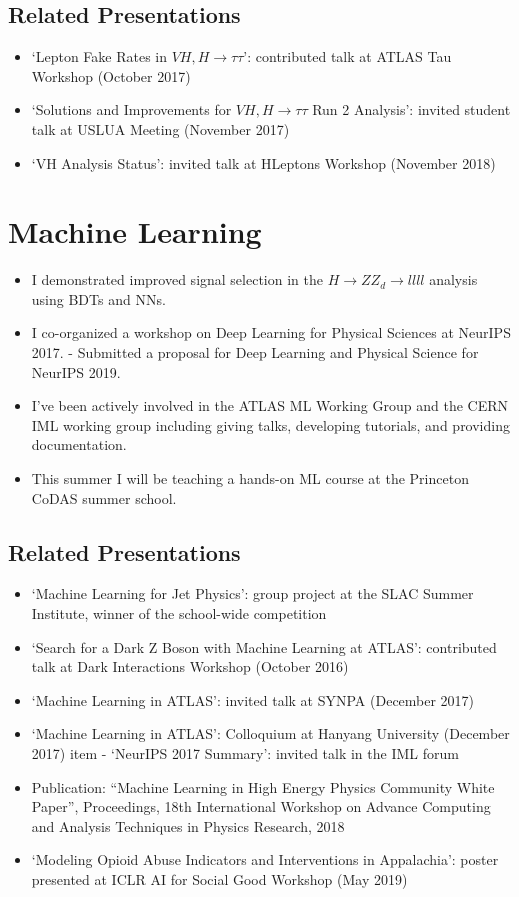 \subsection{Related Presentations}
\begin{itemize}
    \item ‘Lepton Fake Rates in $VH,H\rightarrow\tau\tau$’: contributed talk at ATLAS Tau Workshop (October 2017)
    \item ‘Solutions and Improvements for $VH,H\rightarrow\tau\tau$ Run 2 Analysis’: invited student talk at USLUA Meeting (November 2017)
    \item ‘VH Analysis Status’: invited talk at HLeptons Workshop (November 2018)
\end{itemize}

\section{Machine Learning}
\begin{itemize}
    \item I demonstrated improved signal selection in the $H\rightarrow ZZ_d\rightarrow llll$ analysis using BDTs and NNs.
    \item I co-organized a workshop on Deep Learning for Physical Sciences at NeurIPS 2017.
    \subitem - Submitted a proposal for Deep Learning and Physical Science for NeurIPS 2019.
    \item I've been actively involved in the ATLAS ML Working Group and the CERN IML working group including giving talks, developing tutorials, and providing documentation.
    \item This summer I will be teaching a hands-on ML course at the Princeton CoDAS summer school. 
\end{itemize}

\subsection{Related Presentations}
\begin{itemize}
    \item  `Machine Learning for Jet Physics': group project at the SLAC Summer Institute, winner of the school-wide competition
    \item ‘Search for a Dark Z Boson with Machine Learning at ATLAS’: contributed talk at Dark Interactions Workshop (October 2016)
    \item ‘Machine Learning in ATLAS’: invited talk at SYNPA (December 2017)
    \item ‘Machine Learning in ATLAS’: Colloquium at Hanyang University (December 2017)
    item - `NeurIPS 2017 Summary': invited talk in the IML forum 
    \item Publication: “Machine Learning in High Energy Physics Community White Paper”, Proceedings, 18th International Workshop on Advance Computing and Analysis Techniques in Physics Research, 2018
    \item `Modeling Opioid Abuse Indicators and Interventions in Appalachia': poster presented at ICLR AI for Social Good Workshop (May 2019)
\end{itemize}

